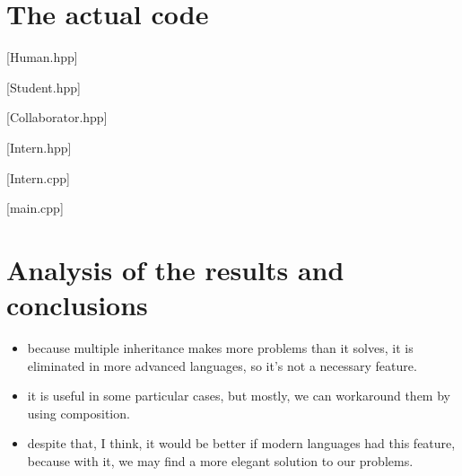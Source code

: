\documentclass{article}
\begin{document}
	\section{The actual code}
		\begin{center}

		\begin{minipage}{\textwidth}
			[Human.hpp]
		\end{minipage}

		\begin{minipage}{\textwidth}
			[Student.hpp]
		\end{minipage}

		\begin{minipage}{\textwidth}
			[Collaborator.hpp]
		\end{minipage}

		\begin{minipage}{\textwidth}
			[Intern.hpp]
		\end{minipage}

		\begin{minipage}{\textwidth}
			[Intern.cpp]
		\end{minipage}

		\begin{minipage}{\textwidth}
			[main.cpp]
		\end{minipage}

		\end{center}

	\section{Analysis of the results and conclusions}
		\begin{itemize}
			\item because multiple inheritance makes more problems than it solves, it is eliminated in more advanced languages, so it's not a necessary feature.

			\item it is useful in some particular cases, but mostly, we can workaround them by using composition.

			\item despite that, I think, it would be better if modern languages had this feature, because with it, we may find a more elegant solution to our problems.
		\end{itemize}
\end{document}
